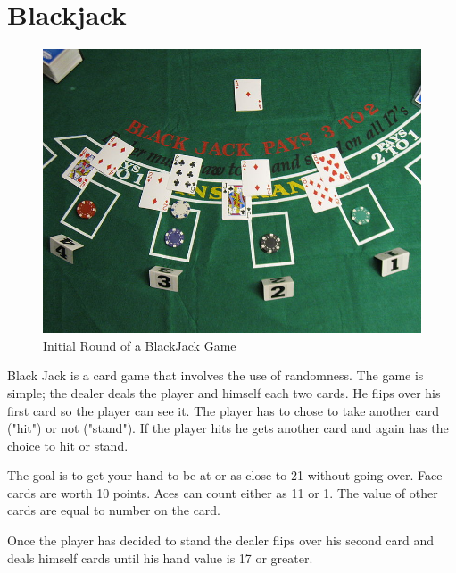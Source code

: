 \label{Ch:BJ}


\section*{Blackjack}


\begin{figure}[H]
\includegraphics[scale = .9]{Blackjack_game_1.jpg}
\caption{Initial Round of a BlackJack Game}
\end{figure}

Black Jack is a card game that involves the use of randomness. The game is simple; the dealer deals the player and himself each two cards. He flips over his first card so the player can see it. The player has to chose to take another card ("hit") or not ("stand"). If the player hits he gets another card and again has the choice to hit or stand.

The goal is to get your hand to be at or as close to 21 without going over. Face cards are worth 10 points. Aces can count either as 11 or 1. The value of other cards are equal to number on the card.

Once the player has decided to stand the dealer flips over his second card and deals himself cards until his hand value is 17 or greater. 


